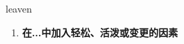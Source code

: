 
\begin{frame}
{\huge leaven}
\begin{center}
\begin{enumerate}\Large
  \item \textbf{在...中加入轻松、活泼或变更的因素}
\end{enumerate}
\end{center}
\end{frame}
